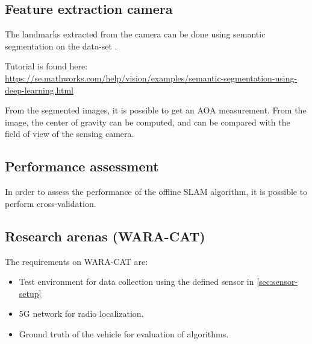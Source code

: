 \subsection{Feature extraction camera}

The landmarks extracted from the camera can be done using semantic
segmentation on the data-set \cite{Brostow:2009:SOC:1464534.1465403}.

Tutorial is found here:
\url{https://se.mathworks.com/help/vision/examples/semantic-segmentation-using-deep-learning.html}

From the segmented images, it is possible to get an \gls{AOA}
measurement. From the image, the center of gravity can be computed,
and can be compared with the field of view of the sensing camera.

\subsection{Performance assessment}

In order to assess the performance of the offline \gls{SLAM}
algorithm, it is possible to perform cross-validation.

\subsection{Research arenas (WARA-CAT)}


The requirements on WARA-CAT are:
\begin{itemize}
\item Test environment for data collection using the defined sensor in
  \ref{sec:sensor-setup}
\item 5G network for radio localization.
\item Ground truth of the vehicle for evaluation of algorithms.
\end{itemize}


